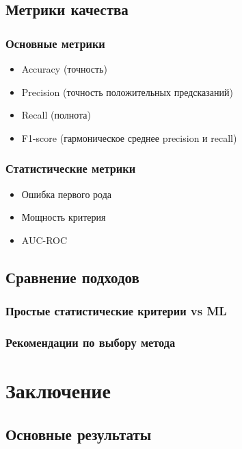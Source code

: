\documentclass[a4paper,12pt]{report}
\begin{document}
\section{Метрики качества}

\subsection{Основные метрики}
\begin{itemize}
    \item Accuracy (точность)
    \item Precision (точность положительных предсказаний)
    \item Recall (полнота)
    \item F1-score (гармоническое среднее precision и recall)
\end{itemize}

\subsection{Статистические метрики}
\begin{itemize}
    \item Ошибка первого рода
    \item Мощность критерия
    \item AUC-ROC
\end{itemize}

\section{Сравнение подходов}

\subsection{Простые статистические критерии vs ML}

\subsection{Рекомендации по выбору метода}

\chapter*{Заключение}

\section*{Основные результаты}
\end{document}
